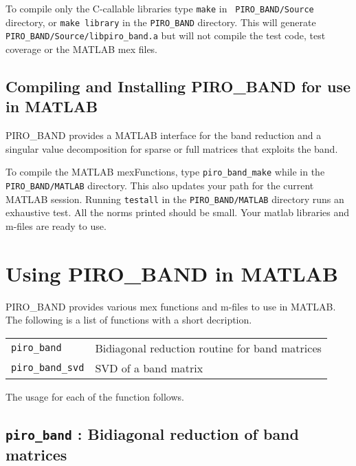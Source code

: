 \documentclass[11pt]{article}
\begin{document}
To compile only the C-callable libraries type {\tt make} in {\tt
PIRO\_BAND/Source} directory, or {\tt make library} in the {\tt PIRO\_BAND}
directory.  This will generate {\tt PIRO\_BAND/Source/libpiro\_band.a} but will
not compile the test code, test coverage or the MATLAB mex files.

\subsection{Compiling and Installing PIRO\_BAND for use in MATLAB }

PIRO\_BAND provides a MATLAB interface for the band reduction and a
singular value decomposition for sparse or full matrices that exploits
the band.

To compile the MATLAB mexFunctions, type {\tt piro\_band\_make} while in the
{\tt PIRO\_BAND/MATLAB} directory.  This also updates your path for the current
MATLAB session.  Running {\tt testall} in the {\tt PIRO\_BAND/MATLAB} directory
runs an exhaustive test.  All the norms printed should be small. Your matlab
libraries and m-files are ready to use.

\newpage \section{Using PIRO\_BAND in MATLAB}

PIRO\_BAND provides various mex functions and m-files to use in MATLAB. The
following is a list of functions with a short decription.

\vspace{0.1in}
\begin{tabular}{ll}
\hline
{\tt piro\_band}         & Bidiagonal reduction routine for band matrices \\
{\tt piro\_band\_svd}    & SVD of a band matrix \\
\end{tabular}

The usage for each of the function follows.

\subsection{{\tt piro\_band} : Bidiagonal reduction of band matrices}

\end{document}
